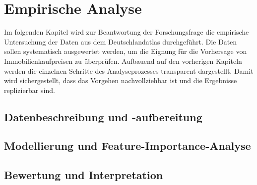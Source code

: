 \newpage

\section{Empirische Analyse} \label{empirischeanalyse}
Im folgenden Kapitel wird zur Beantwortung der Forschungsfrage die empirische Untersuchung der Daten aus dem Deutschlandatlas durchgeführt. Die Daten sollen systematisch ausgewertet werden, um die Eignung für die Vorhersage von Immobilienkaufpreisen zu überprüfen. Aufbauend auf den vorherigen Kapiteln werden die einzelnen Schritte des Analyseprozesses transparent dargestellt. Damit wird sichergestellt, dass das Vorgehen nachvollziehbar ist und die Ergebnisse replizierbar sind.

\subsection{Datenbeschreibung und -aufbereitung} \label{datenbeschreibungundaufbereitung}


\subsection{Modellierung und Feature-Importance-Analyse} \label{modellierungundfeatureimportanceanalyse}


\subsection{Bewertung und Interpretation} \label{bewertungundinterpretation}
